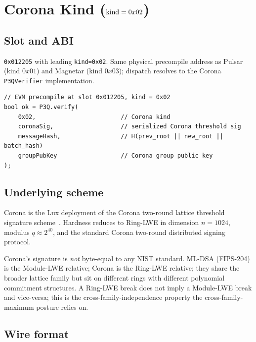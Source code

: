 \section{Corona Kind ($\textnormal{kind} = 0x02$)}
\label{sec:corona-kind}

\subsection{Slot and ABI}

\texttt{0x012205} with leading \texttt{kind=0x02}. Same physical
precompile address as Pulsar (kind $0x01$) and Magnetar
(kind $0x03$); dispatch resolves to the Corona
\texttt{P3QVerifier} implementation.

\begin{lstlisting}[language={}]
// EVM precompile at slot 0x012205, kind = 0x02
bool ok = P3Q.verify(
    0x02,                        // Corona kind
    coronaSig,                   // serialized Corona threshold sig
    messageHash,                 // H(prev_root || new_root || batch_hash)
    groupPubKey                  // Corona group public key
);
\end{lstlisting}

\subsection{Underlying scheme}

Corona is the Lux deployment of the Corona two-round
lattice threshold signature scheme~\cite{corona2024}. Hardness
reduces to Ring-LWE in dimension $n = 1024$, modulus $q
\approx 2^{40}$, and the standard Corona two-round
distributed signing protocol.

Corona's signature is \emph{not} byte-equal to any NIST standard.
ML-DSA (FIPS-204) is the Module-LWE relative; Corona is the
Ring-LWE relative; they share the broader lattice family but
sit on different rings with different polynomial commitment
structures. A Ring-LWE break does not imply a Module-LWE break
and vice-versa; this is the cross-family-independence property
the cross-family-maximum posture relies on.

\subsection{Wire format}


